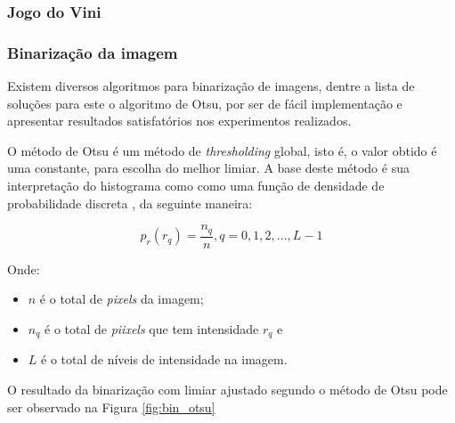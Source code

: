 \documentclass{sciposter}
\begin{document}
\begin{multicols}{3}
\subsubsection*{Jogo do Vini}





\subsubsection{Binarização da imagem}

Existem diversos algoritmos para binarização de imagens, dentre a lista de soluções para este  o algoritmo de Otsu, por ser de fácil implementação e apresentar resultados satisfatórios nos experimentos realizados.

O método de Otsu é um método de \textit{thresholding} global, isto é, o valor obtido é
uma constante, para escolha do melhor limiar. A base deste método é sua interpretação
do histograma como como uma função de densidade de probabilidade
discreta \cite{Limiar}, da seguinte maneira:

\begin{equation}\label{eq:histograma_norm}
  p_r(r_q) = \frac{n_q}{n}, q = 0, 1, 2, ..., L-1
\end{equation}

Onde:

\begin{itemize}
  \item $ n $ é o total de \textit{pixels} da imagem;
  \item $ n_q $ é o total de \textit{piixels} que tem intensidade $ r_q $ e
  \item $ L $ é o total de níveis de intensidade na imagem.
\end{itemize}

O resultado da binarização com limiar ajustado segundo o método de Otsu pode
ser observado na Figura \ref{fig:bin_otsu}


\end{multicols}
\end{document}

